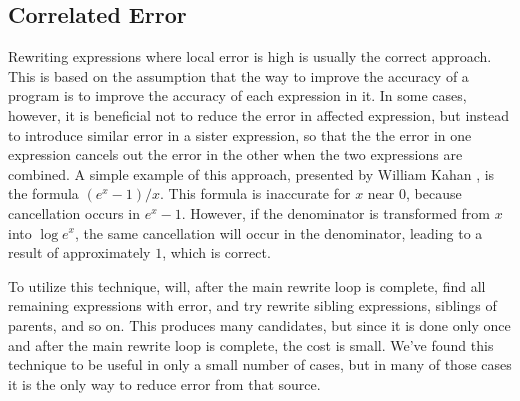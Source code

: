 \documentclass[paper.tex]{subfiles}
\begin{document}
\subsection{Correlated Error}

Rewriting expressions where local error is high
  is usually the correct approach.
This is based on the assumption
  that the way to improve the accuracy of a program
  is to improve the accuracy of each expression in it.
In some cases, however, it is beneficial not to reduce the error in affected expression,
  but instead to introduce similar error in a sister expression,
  so that the the error in one expression
  cancels out the error in the other
  when the two expressions are combined.
A simple example of this approach,
  presented by William Kahan ,
  is the formula $(e^x - 1) / x$.
This formula is inaccurate for $x$ near $0$,
  because cancellation occurs in $e^x - 1$.
However, if the denominator is transformed from $x$ into $\log e^x$,
  the same cancellation will occur in the denominator,
  leading to a result of approximately $1$, which is correct.

To utilize this technique,
  \casio will, after the main rewrite loop is complete,
  find all remaining expressions with error,
  and try rewrite sibling expressions, siblings of parents, and so on.
This produces many candidates, but since it is done only once
  and after the main rewrite loop is complete, the cost is small.
We've found this technique to be useful in only a small number of cases,
  but in many of those cases it is the only way to reduce error from that source.
\end{document}
